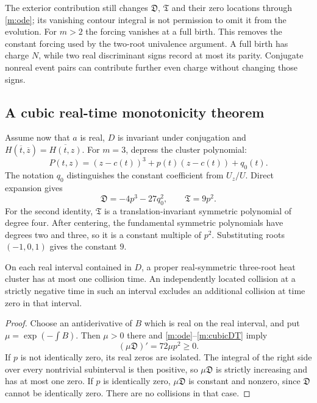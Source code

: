 The exterior contribution still changes $\mathfrak D$, $\mathfrak T$
and their zero locations through \eqref{m:ode}; its vanishing contour
integral is not permission to omit it from the evolution.  For $m>2$
the forcing vanishes at a full birth.  This removes the constant
forcing used by the two-root univalence argument.  A full birth has
charge $N$, while two real discriminant signs record at most its
parity.  Conjugate nonreal event pairs can contribute further even
charge without changing those signs.

\subsection{A cubic real-time monotonicity theorem}

Assume now that $a$ is real, $D$ is invariant under conjugation and
$H(\overline t,\overline z)=\overline{H(t,z)}$.  For $m=3$, depress
the cluster polynomial:
\[
 P(t,z)=(z-c(t))^3+p(t)(z-c(t))+q_0(t).
\]
The notation $q_0$ distinguishes the constant coefficient from $U_z/U$.
Direct expansion gives
\begin{equation}\label{m:cubicDT}
 \mathfrak D=-4p^3-27q_0^2,\qquad \mathfrak T=9p^2.
\end{equation}
For the second identity, $\mathfrak T$ is a translation-invariant
symmetric polynomial of degree four.  After centering, the fundamental
symmetric polynomials have degrees two and three, so it is a constant
multiple of $p^2$.  Substituting roots $(-1,0,1)$ gives the constant
$9$.

\begin{proposition}
\label{m:cubicmonotone}
On each real interval contained in $D$, a proper real-symmetric
three-root heat cluster has at most one collision time.  An
independently located collision at a strictly negative time in such an
interval excludes an additional collision at time zero in that
interval.
\end{proposition}
\begin{proof}
Choose an antiderivative of $B$ which is real on the real
interval, and put $\mu=\exp(-\int B)$.  Then $\mu>0$ there
and \eqref{m:ode}--\eqref{m:cubicDT} imply
\begin{equation}\label{m:cubicderivative}
                  (\mu\mathfrak D)'=72\mu p^2\geq0.
\end{equation}
If $p$ is not identically zero, its real zeros are isolated.  The
integral of the right side over every nontrivial subinterval is then
positive, so $\mu\mathfrak D$ is strictly increasing and has at most
one zero.  If $p$ is identically zero, $\mu\mathfrak D$ is constant
and nonzero, since $\mathfrak D$ cannot be identically zero.  There
are no collisions in that case.
\end{proof}

